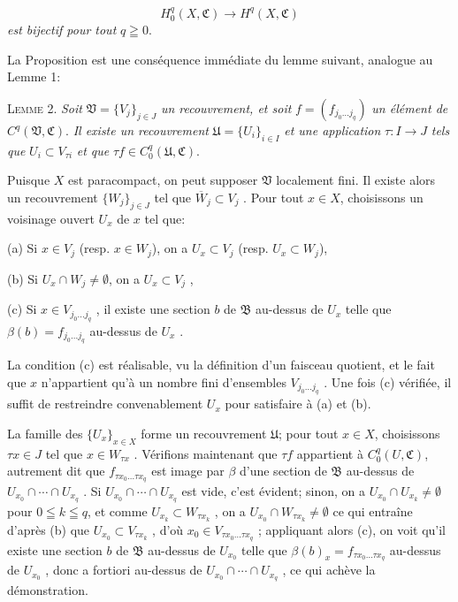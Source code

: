 \begin{equation*}
H_0^q(X, \mathfrak{C}) \longrightarrow H^q(X, \mathfrak{C})
\end{equation*}
\textit{est bijectif pour tout} $q \geqq 0$.

La Proposition est une conséquence immédiate du lemme suivant, analogue au Lemme 1:

\textsc{Lemme} 2. \textit{Soit} $\mathfrak{V} = \{V_j\}_{j \in J}$ \textit{un recouvrement, et soit} $f = (f_{j_0 \ldots j_q})$ \textit{un élément de} $C^q(\mathfrak{V}, \mathfrak{C})$. \textit{Il existe un recouvrement} $\mathfrak{U} = \{U_i\}_{i \in I}$ \textit{et une application} $\tau: I \rightarrow J$ \textit{tels que} $U_i \subset V_{\tau i}$ \textit{et que} $\tau f \in C_0^q(\mathfrak{U}, \mathfrak{C})$.

Puisque $X$ est paracompact, on peut supposer $\mathfrak{V}$ localement fini. Il existe alors un recouvrement $\{W_j\}_{j \in J}$ tel que $\overline{W}_j \subset V_j$ . Pour tout $x \in X$, choisissons un voisinage ouvert $U_x$ de $x$ tel que:

(a) Si $x \in V_j$ (resp. $x \in W_j$), on a $U_x \subset V_j$ (resp. $U_x \subset W_j$),

(b) Si $U_x \cap W_j \neq \emptyset$, on a $U_x \subset V_j$ ,

(c) Si $x \in V_{j_0 \ldots j_q}$ , il existe une section $b$ de $\mathfrak{B}$ au-dessus de $U_x$ telle que $\beta(b) = f_{j_0 \ldots j_q}$ au-dessus de $U_x$ .

La condition (c) est réalisable, vu la définition d'un faisceau quotient, et le fait que $x$ n'appartient qu'à un nombre fini d'ensembles $V_{j_0 \ldots j_q}$ . Une fois (c) vérifiée, il suffit de restreindre convenablement $U_x$ pour satisfaire à (a) et (b).

La famille des $\{U_x\}_{x \in X}$ forme un recouvrement $\mathfrak{U}$; pour tout $x \in X$, choisissons $\tau x \in J$ tel que $x \in W_{\tau x}$ . Vérifions maintenant que $\tau f$ appartient à $C_0^q(U, \mathfrak{C})$, autrement dit que $f_{\tau x_0 \ldots \tau x_q}$ est image par $\beta$ d'une section de $\mathfrak{B}$ au-dessus de $U_{x_0} \cap \cdots \cap U_{x_q}$ . Si $U_{x_0} \cap \cdots \cap U_{x_q}$ est vide, c'est évident; sinon, on a $U_{x_0} \cap U_{x_k} \neq \emptyset$ pour $0 \leqq k \leqq q$, et comme $U_{x_k} \subset W_{\tau x_k}$ , on a $U_{x_0} \cap W_{\tau x_k} \neq \emptyset$ ce qui entraîne d'après (b) que $U_{x_0} \subset V_{\tau x_k}$ , d'où $x_0 \in V_{\tau x_0 \ldots \tau x_q}$ ; appliquant alors (c), on voit qu'il existe une section $b$ de $\mathfrak{B}$ au-dessus de $U_{x_0}$ telle que $\beta(b)_x = f_{\tau x_0 \ldots \tau x_q}$ au-dessus de $U_{x_0}$ , donc a fortiori au-dessus de $U_{x_0} \cap \cdots \cap U_{x_q}$ , ce qui achève la démonstration.


